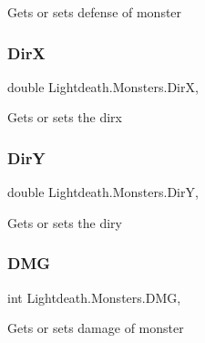 Gets or sets defense of monster 

\hypertarget{class_lightdeath_1_1_monsters_a9fc8257458767323affd7ca9feae0b65}{}\label{class_lightdeath_1_1_monsters_a9fc8257458767323affd7ca9feae0b65} 
\subsubsection{\texorpdfstring{DirX}{DirX}}
{\footnotesize\ttfamily double Lightdeath.\+Monsters.\+DirX\hspace{0.3cm}{\ttfamily [get]}, {\ttfamily [set]}}



Gets or sets the dirx 

\hypertarget{class_lightdeath_1_1_monsters_a2400b8efb33b0df96471516e30e44862}{}\label{class_lightdeath_1_1_monsters_a2400b8efb33b0df96471516e30e44862} 
\subsubsection{\texorpdfstring{DirY}{DirY}}
{\footnotesize\ttfamily double Lightdeath.\+Monsters.\+DirY\hspace{0.3cm}{\ttfamily [get]}, {\ttfamily [set]}}



Gets or sets the diry 

\hypertarget{class_lightdeath_1_1_monsters_ad12fcf0a30214864c743bb5d3f4e4a4a}{}\label{class_lightdeath_1_1_monsters_ad12fcf0a30214864c743bb5d3f4e4a4a} 
\subsubsection{\texorpdfstring{D\+MG}{DMG}}
{\footnotesize\ttfamily int Lightdeath.\+Monsters.\+D\+MG\hspace{0.3cm}{\ttfamily [get]}, {\ttfamily [set]}}



Gets or sets damage of monster 

\hypertarget{class_lightdeath_1_1_monsters_a6ea9fb91a6b87941e4521504da3a2aa4}{}\label{class_lightdeath_1_1_monsters_a6ea9fb91a6b87941e4521504da3a2aa4} 
